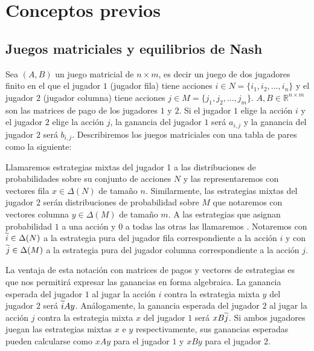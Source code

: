 \chapter{Conceptos previos}  \label{cap:previos}


\section{Juegos matriciales y equilibrios de Nash}

Sea $(A, B)$ un juego matricial de $n \times m$, es decir un juego de dos jugadores finito en el que el jugador $1$ (jugador fila) tiene acciones $i \in N = \{i_1, i_2, \dots, i_n\}$ y el jugador $2$ (jugador columna) tiene acciones $j \in M = \{j_1, j_2, \dots, j_m\}$. $A, B \in \mathbb{R}^{n \times m}$ son las matrices de pago de los jugadores $1$ y $2$. Si el jugador $1$ elige la acción $i$ y el jugador $2$ elige la acción $j$, la ganancia del jugador $1$ será $a_{i,j}$ y la ganancia del jugador $2$ será $b_{i,j}$. Describiremos los juegos matriciales con una tabla de pares como la siguiente:



Llamaremos estrategias mixtas del jugador 1 a las distribuciones de probabilidades sobre su conjunto de acciones $N$ y las representaremos con vectores fila $x \in \Delta(N)$ de tamaño $n$. Similarmente, las estrategias mixtas del jugador 2 serán distribuciones de probabilidad sobre $M$ que notaremos con vectores columna $y \in \Delta(M)$ de tamaño $m$. A las estrategias que asignan probabilidad $1$ a una acción y $0$ a todas las otras las llamaremos . Notaremos con $\widetilde{i}\in \Delta(N)$ a la estrategia pura del jugador fila correspondiente a la acción $i$ y con $\widetilde{j}\in \Delta(M)$ a la estrategia pura del jugador columna correspondiente a la acción $j$.

La ventaja de esta notación con matrices de pagos y vectores de estrategias es que nos permitirá expresar las ganancias en forma algebraica. La ganancia esperada del jugador $1$ al jugar la acción $i$ contra la estrategia mixta $y$ del jugador $2$ será $\widetilde{i}Ay$. Análogamente, la ganancia esperada del jugador $2$ al jugar la acción $j$ contra la estrategia mixta $x$ del jugador $1$ será $xB\widetilde{j}$. Si ambos jugadores juegan las estrategias mixtas $x$ e $y$ respectivamente, sus ganancias esperadas pueden calcularse como $xAy$ para el jugador $1$ y $xBy$ para el jugador $2$.

